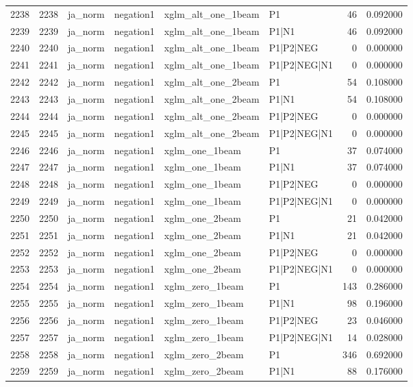 \begin{tabular}{lrllllrr}
2238 & 2238 & ja_norm & negation1 & xglm_alt_one_1beam & P1 & 46 & 0.092000 \\
2239 & 2239 & ja_norm & negation1 & xglm_alt_one_1beam & P1|N1 & 46 & 0.092000 \\
2240 & 2240 & ja_norm & negation1 & xglm_alt_one_1beam & P1|P2|NEG & 0 & 0.000000 \\
2241 & 2241 & ja_norm & negation1 & xglm_alt_one_1beam & P1|P2|NEG|N1 & 0 & 0.000000 \\
2242 & 2242 & ja_norm & negation1 & xglm_alt_one_2beam & P1 & 54 & 0.108000 \\
2243 & 2243 & ja_norm & negation1 & xglm_alt_one_2beam & P1|N1 & 54 & 0.108000 \\
2244 & 2244 & ja_norm & negation1 & xglm_alt_one_2beam & P1|P2|NEG & 0 & 0.000000 \\
2245 & 2245 & ja_norm & negation1 & xglm_alt_one_2beam & P1|P2|NEG|N1 & 0 & 0.000000 \\
2246 & 2246 & ja_norm & negation1 & xglm_one_1beam & P1 & 37 & 0.074000 \\
2247 & 2247 & ja_norm & negation1 & xglm_one_1beam & P1|N1 & 37 & 0.074000 \\
2248 & 2248 & ja_norm & negation1 & xglm_one_1beam & P1|P2|NEG & 0 & 0.000000 \\
2249 & 2249 & ja_norm & negation1 & xglm_one_1beam & P1|P2|NEG|N1 & 0 & 0.000000 \\
2250 & 2250 & ja_norm & negation1 & xglm_one_2beam & P1 & 21 & 0.042000 \\
2251 & 2251 & ja_norm & negation1 & xglm_one_2beam & P1|N1 & 21 & 0.042000 \\
2252 & 2252 & ja_norm & negation1 & xglm_one_2beam & P1|P2|NEG & 0 & 0.000000 \\
2253 & 2253 & ja_norm & negation1 & xglm_one_2beam & P1|P2|NEG|N1 & 0 & 0.000000 \\
2254 & 2254 & ja_norm & negation1 & xglm_zero_1beam & P1 & 143 & 0.286000 \\
2255 & 2255 & ja_norm & negation1 & xglm_zero_1beam & P1|N1 & 98 & 0.196000 \\
2256 & 2256 & ja_norm & negation1 & xglm_zero_1beam & P1|P2|NEG & 23 & 0.046000 \\
2257 & 2257 & ja_norm & negation1 & xglm_zero_1beam & P1|P2|NEG|N1 & 14 & 0.028000 \\
2258 & 2258 & ja_norm & negation1 & xglm_zero_2beam & P1 & 346 & 0.692000 \\
2259 & 2259 & ja_norm & negation1 & xglm_zero_2beam & P1|N1 & 88 & 0.176000 \\

\end{tabular}
